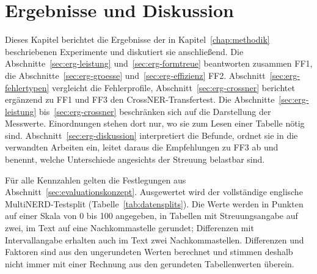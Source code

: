 %
%

\chapter{Ergebnisse und Diskussion}
\label{chap:ergebnisse}

Dieses Kapitel berichtet die Ergebnisse der in Kapitel~\ref{chap:methodik}
beschriebenen Experimente und diskutiert sie anschließend.
Die Abschnitte~\ref{sec:erg-leistung} und~\ref{sec:erg-formtreue}
beantworten zusammen FF1, die Abschnitte~\ref{sec:erg-groesse}
und~\ref{sec:erg-effizienz} FF2.
Abschnitt~\ref{sec:erg-fehlertypen} vergleicht die Fehlerprofile,
Abschnitt~\ref{sec:erg-crossner} berichtet ergänzend zu FF1 und FF3
den CrossNER-Transfertest.
Die Abschnitte~\ref{sec:erg-leistung} bis~\ref{sec:erg-crossner}
beschränken sich auf die Darstellung der Messwerte. Einordnungen stehen
dort nur, wo sie zum Lesen einer Tabelle nötig sind.
Abschnitt~\ref{sec:erg-diskussion} interpretiert die Befunde, ordnet sie
in die verwandten Arbeiten ein, leitet daraus die Empfehlungen zu FF3 ab
und benennt, welche Unterschiede angesichts der Streuung belastbar sind.

Für alle Kennzahlen gelten die Festlegungen aus
Abschnitt~\ref{sec:evaluationskonzept}. Ausgewertet wird der
vollständige englische MultiNERD-Testsplit
(Tabelle~\ref{tab:datensplits}).
Die Werte werden in Punkten auf einer Skala von 0 bis 100 angegeben, in
Tabellen mit Streuungsangabe auf zwei, im Text auf eine Nachkommastelle
gerundet; Differenzen mit Intervallangabe erhalten auch im Text zwei
Nachkommastellen.
Differenzen und Faktoren sind aus den ungerundeten Werten berechnet und
stimmen deshalb nicht immer mit einer Rechnung aus den gerundeten
Tabellenwerten überein.

